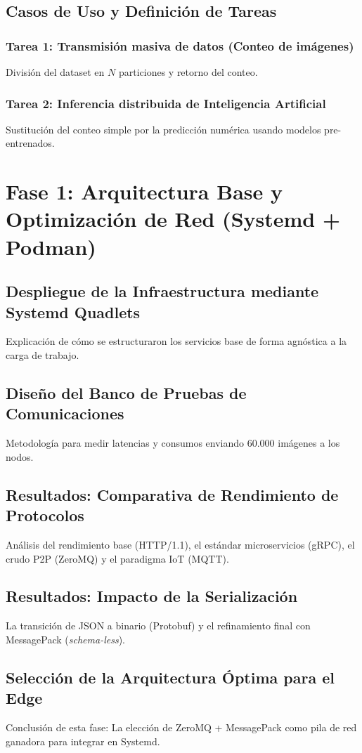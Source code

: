 \documentclass[11pt, a4paper]{report}
\begin{document}
\section{Casos de Uso y Definición de Tareas}
\subsection{Tarea 1: Transmisión masiva de datos (Conteo de imágenes)}
División del dataset en $N$ particiones y retorno del conteo.
\subsection{Tarea 2: Inferencia distribuida de Inteligencia Artificial}
Sustitución del conteo simple por la predicción numérica usando modelos pre-entrenados.

\chapter{Fase 1: Arquitectura Base y Optimización de Red (Systemd + Podman)}

\section{Despliegue de la Infraestructura mediante Systemd Quadlets}
Explicación de cómo se estructuraron los servicios base de forma agnóstica a la carga de trabajo.

\section{Diseño del Banco de Pruebas de Comunicaciones}
Metodología para medir latencias y consumos enviando 60.000 imágenes a los nodos.

\section{Resultados: Comparativa de Rendimiento de Protocolos}
Análisis del rendimiento base (HTTP/1.1), el estándar microservicios (gRPC), el crudo P2P (ZeroMQ) y el paradigma IoT (MQTT).

\section{Resultados: Impacto de la Serialización}
La transición de JSON a binario (Protobuf) y el refinamiento final con MessagePack (\textit{schema-less}).

\section{Selección de la Arquitectura Óptima para el Edge}
Conclusión de esta fase: La elección de ZeroMQ + MessagePack como pila de red ganadora para integrar en Systemd.
\end{document}
